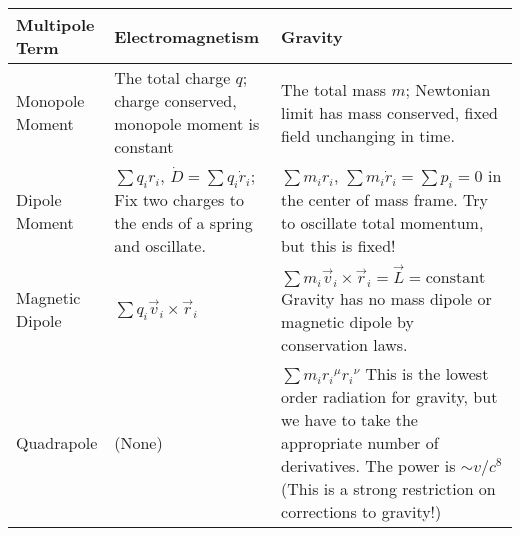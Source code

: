 \medbreak
\noindent\begin{tabular}{p{7pc}|p{11pc}p{11pc}}%
\toprule
Multipole Term&Electromagnetism & Gravity\\\midrule
Monopole Moment 
  & The total charge $q$; charge conserved, monopole moment is constant 
  & The total mass $m$; Newtonian limit has mass conserved, fixed
  field unchanging in time. \\    
Dipole Moment 
  & $\sum q_{i}r_{i}$, $\dot{D}=\sum q_{i}\dot{r}_{i}$; Fix two
  charges to the ends of a spring and oscillate.
  & $\sum m_{i}r_{i}$, $\sum m_{i}\dot{r}_{i} = \sum p_{i}=0$ in
  the center of mass frame. Try to oscillate total momentum, but
  this is fixed!\\
Magnetic Dipole
  & $\sum q_{i}\vec{v}_{i}\times\vec{r}_{i}$ 
  & $\sum m_{i}\vec{v}_{i}\times\vec{r}_{i}=\vec{L}=\mbox{constant}$
    Gravity has no mass dipole or magnetic dipole by conservation
    laws.\\
Quadrapole 
  & (None)
  & $\sum m_{i}{r_{i}}^{\mu}{r_{i}}^{\nu}$ This is the lowest
  order radiation for gravity, but we have to take the
  appropriate number of derivatives. The power is $\sim v/c^{8}$
  (This is a strong restriction on corrections to gravity!)\\
\bottomrule
\end{tabular}
